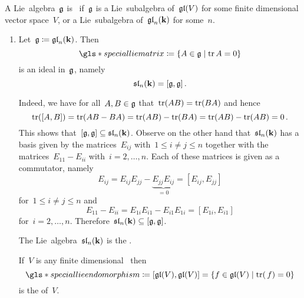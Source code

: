 \begin{definition}
  A Lie~algebra~$\mathfrak{g}$ is~ if~$\mathfrak{g}$ is a Lie~subalgebra of~$\mathfrak{gl}(V)$ for some finite dimensional vector space~$V$, or a Lie~subalgebra of~$\mathfrak{gl}_n(\mathbf{k})$ for some~$n$.
\end{definition}


\begin{examples}
  \leavevmode
  \begin{enumerate}
    \item
      Let~$\mathfrak{g} \coloneqq \mathfrak{gl}_n(\mathbf{k})$.
      Then
      \[
        \gls*{special lie matrix}
        \defined
        \{
          A \in \glie
        \suchthat
          \tr A = 0
        \}
      \]
      is an ideal in~$\mathfrak{g}$, namely
      \[
        \mathfrak{sl}_n(\mathbf{k})
        =
        [\mathfrak{g},\mathfrak{g}]  \,.
      \]
        
      Indeed, we have for all~$A, B \in \mathfrak{g}$ that~$\operatorname{tr}(AB) = \operatorname{tr}(BA)$ and hence
      \[
          \operatorname{tr}( [A,B] )
        = \operatorname{tr}(AB-BA)
        = \operatorname{tr}(AB) - \operatorname{tr}(BA)
        = \operatorname{tr}(AB) - \operatorname{tr}(AB)
        = 0  \,.
      \]
      This shows that~$[\mathfrak{g}, \mathfrak{g}] \subseteq \mathfrak{sl}_n(\mathbf{k})$.
      Observe on the other hand that~$\mathfrak{sl}_n(\mathbf{k})$ has a basis given by the matrices~$E_{ij}$ with~$1 \leq i \neq j \leq n$ together with the matrices~$E_{11} - E_{ii}$ with~$i = 2, \dotsc, n$.
      Each of these matrices is given as a commutator, namely
      \[
          E_{ij}
          =
          E_{ij} E_{jj} - \underbrace{ E_{jj} E_{ij} }_{=0}
          =
          [E_{ij}, E_{jj}]
      \]
      for~$1 \leq i \neq j \leq n$ and
      \[
        E_{11} - E_{ii}
        =
        E_{1i} E_{i1} - E_{i1} E_{1i}
        =
        [E_{1i}, E_{i1}]
      \]
      for~$i = 2, \dotsc, n$.
      Therefore~$\mathfrak{sl}_n(\mathbf{k}) \subseteq [\mathfrak{g}, \mathfrak{g}]$.
      
      The Lie~algebra~$\mathfrak{sl}_n(\mathbf{k})$ is the .
      
      If~$V$ is any finite dimensional~{\vectorspace{$\kf$}} then
      \[
        \gls*{special lie endomorphism}
        \defined
        [\gllie(V), \gllie(V)]
        =
        \{
          f \in \gllie(V)
        \suchthat
          \tr(\spacing f) = 0
        \}
      \]
      is the  of~$V$.
   

\end{enumerate}
\end{examples}

